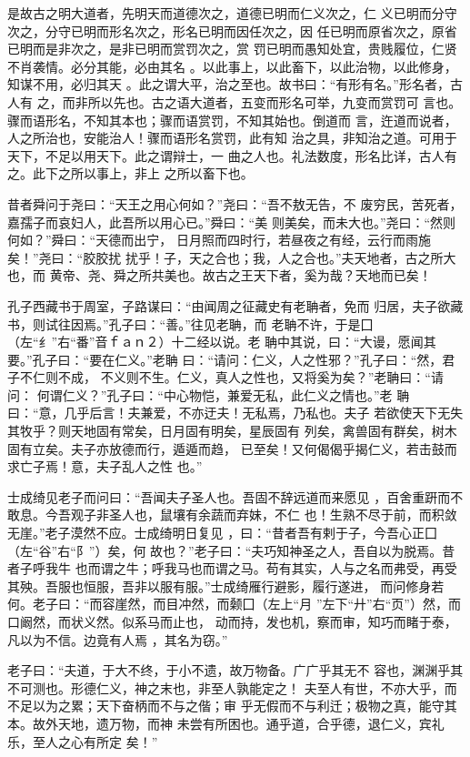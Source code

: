 是故古之明大道者，先明天而道德次之，道德已明而仁义次之，仁 义已明而分守次之，分守已明而形名次之，形名已明而因任次之，因 任已明而原省次之，原省已明而是非次之，是非已明而赏罚次之，赏 罚已明而愚知处宜，贵贱履位，仁贤不肖袭情。必分其能，必由其名 。以此事上，以此畜下，以此治物，以此修身，知谋不用，必归其天 。此之谓大平，治之至也。故书曰：“有形有名。”形名者，古人有 之，而非所以先也。古之语大道者，五变而形名可举，九变而赏罚可 言也。骤而语形名，不知其本也；骤而语赏罚，不知其始也。倒道而 言，迕道而说者，人之所治也，安能治人！骤而语形名赏罚，此有知 治之具，非知治之道。可用于天下，不足以用天下。此之谓辩士，一 曲之人也。礼法数度，形名比详，古人有之。此下之所以事上，非上 之所以畜下也。

昔者舜问于尧曰：“天王之用心何如？”尧曰：“吾不敖无告，不 废穷民，苦死者，嘉孺子而哀妇人，此吾所以用心已。”舜曰：“美 则美矣，而未大也。”尧曰：“然则何如？”舜曰：“天德而出宁， 日月照而四时行，若昼夜之有经，云行而雨施矣！”尧曰：“胶胶扰 扰乎！子，天之合也；我，人之合也。”夫天地者，古之所大也，而 黄帝、尧、舜之所共美也。故古之王天下者，奚为哉？天地而已矣！

孔子西藏书于周室，子路谋曰：“由闻周之征藏史有老聃者，免而 归居，夫子欲藏书，则试往因焉。”孔子曰：“善。”往见老聃，而 老聃不许，于是囗（左“纟”右“番”音ｆａｎ２）十二经以说。老 聃中其说，曰：“大谩，愿闻其要。”孔子曰：“要在仁义。”老聃 曰：“请问：仁义，人之性邪？”孔子曰：“然，君子不仁则不成， 不义则不生。仁义，真人之性也，又将奚为矣？”老聃曰：“请问： 何谓仁义？”孔子曰：“中心物恺，兼爱无私，此仁义之情也。”老 聃曰：“意，几乎后言！夫兼爱，不亦迂夫！无私焉，乃私也。夫子 若欲使天下无失其牧乎？则天地固有常矣，日月固有明矣，星辰固有 列矣，禽兽固有群矣，树木固有立矣。夫子亦放德而行，遁遁而趋， 已至矣！又何偈偈乎揭仁义，若击鼓而求亡子焉！意，夫子乱人之性 也。”

士成绮见老子而问曰：“吾闻夫子圣人也。吾固不辞远道而来愿见 ，百舍重趼而不敢息。今吾观子非圣人也，鼠壤有余蔬而弃妹，不仁 也！生熟不尽于前，而积敛无崖。”老子漠然不应。士成绮明日复见 ，曰：“昔者吾有剌于子，今吾心正囗（左“谷”右“阝”）矣，何 故也？”老子曰：“夫巧知神圣之人，吾自以为脱焉。昔者子呼我牛 也而谓之牛；呼我马也而谓之马。苟有其实，人与之名而弗受，再受 其殃。吾服也恒服，吾非以服有服。”士成绮雁行避影，履行遂进， 而问修身若何。老子曰：“而容崖然，而目冲然，而颡囗（左上“月 ”左下“廾”右“页”）然，而口阚然，而状义然。似系马而止也， 动而持，发也机，察而审，知巧而睹于泰，凡以为不信。边竟有人焉 ，其名为窃。”

老子曰：“夫道，于大不终，于小不遗，故万物备。广广乎其无不 容也，渊渊乎其不可测也。形德仁义，神之末也，非至人孰能定之！ 夫至人有世，不亦大乎，而不足以为之累；天下奋柄而不与之偕；审 乎无假而不与利迁；极物之真，能守其本。故外天地，遗万物，而神 未尝有所困也。通乎道，合乎德，退仁义，宾礼乐，至人之心有所定 矣！”

